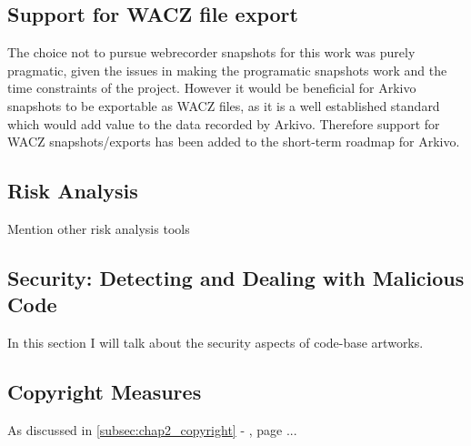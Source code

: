 \subsection{Support for WACZ file export}

The choice not to pursue webrecorder snapshots for this work was purely pragmatic, given the issues in making the programatic snapshots work and the time constraints of the project. However it would be beneficial for Arkivo snapshots to be exportable as WACZ files, as it is a well established standard which would add value to the data recorded by Arkivo. Therefore support for WACZ snapshots/exports has been added to the short-term roadmap for Arkivo.

\subsection{Risk Analysis}

Mention other risk analysis tools \cite{l2beatL2BEATStateLayer2024}


\subsection{Security: Detecting and Dealing with Malicious Code}

In this section I will talk about the security aspects of code-base artworks.





\subsection{Copyright Measures}


As discussed in \autoref{subsec:chap2_copyright} -  , page \pageref{subsec:chap2_copyright}... 